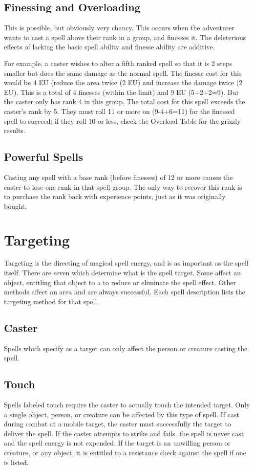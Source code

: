 \begin{multicols*}{2}
\subsection{Finessing and Overloading}
This is possible, but obviously very chancy. This occurs when the adventurer wants to cast a spell above their rank in a group, and finesses it. The deleterious effects of lacking the basic spell ability and finesse ability are additive.

For example, a caster wishes to alter a fifth ranked spell so that it is 2 steps smaller but does the same damage as the normal spell. The finesse cost for this would be 4 EU (reduce the area twice (2 EU) and increase the damage twice (2 EU). This is a total of 4 finesses (within the limit) and 9 EU (5+2+2=9). But the caster only has rank 4 in this group. The total cost for this spell exceeds the caster's rank by 5. They must roll 11 or more on  (9-4+6=11) for the finessed spell to succeed; if they roll 10 or less, check the Overload Table for the grizzly results.
\subsection{Powerful Spells}
Casting any spell with a base rank (before finesses) of 12 or more causes the caster to lose one rank in that spell group. The only way to recover this rank is to purchase the rank back with experience points, just as it was originally bought.
\section{Targeting}
Targeting is the directing of magical spell energy, and is as important as the spell itself. There are seven  which determine what is the spell target. Some affect an object, entitling that object to a  to reduce or eliminate the spell effect. Other methods affect an area and are always successful. Each spell description lists the targeting method for that spell.
\subsection{Caster}
 Spells which specify  as a target can only
affect the person or creature casting the spell.
\subsection{Touch}
 Spells labeled touch require the caster to actually touch the intended target. Only a single object, person, or creature can be affected by this type of spell. If cast during combat at a mobile target, the caster must successfully  the target to deliver the spell. If the caster attempts to strike and fails, the spell is never cast and the spell energy is not expended. If the target is an unwilling person or creature,
or any object, it is entitled to a resistance check against the spell if one is listed.

\end{multicols*}
